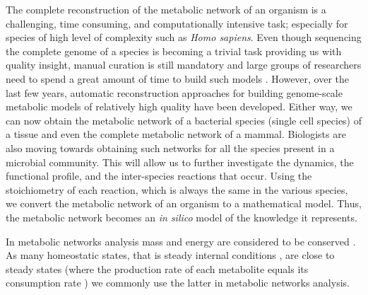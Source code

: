    The complete reconstruction of the metabolic network of an organism is a
   challenging, time consuming, and computationally intensive task; especially for species of high level of complexity such as \emph{Homo sapiens}.
   Even though sequencing the complete genome of a species is becoming a trivial task
   providing us with quality insight, manual curation is still mandatory and large groups 
   of researchers need to spend a great amount of time to build such models \cite{thiele2010protocol}.
   However, over the last few years, automatic reconstruction approaches for building genome-scale metabolic 
   models \cite{machado2018fast} of relatively high quality have been developed.
   Either way, we can now obtain the metabolic network of a bacterial species (single cell species)
   of a tissue and even the complete metabolic network of a mammal.
   Biologists are also moving towards obtaining such networks for all the species present in a microbial community. This will allow us to further investigate the dynamics, the functional profile, and the inter-species reactions that occur.
   Using the stoichiometry of each reaction, which is always the same in the various species,
   we convert the metabolic network of an organism to a mathematical model.
   Thus, the metabolic network becomes an \emph{in silico} model of the knowledge it represents.
   
   In metabolic networks analysis mass and energy are considered to be conserved
   \cite{palsson2009metabolic}. As many homeostatic states, that is steady internal
   conditions \cite{shishvan2018homeostatic}, are close to steady states (where the
   production rate of each metabolite equals its consumption rate
   \cite{cakmak2012new}) we commonly use the latter in metabolic networks analysis.

